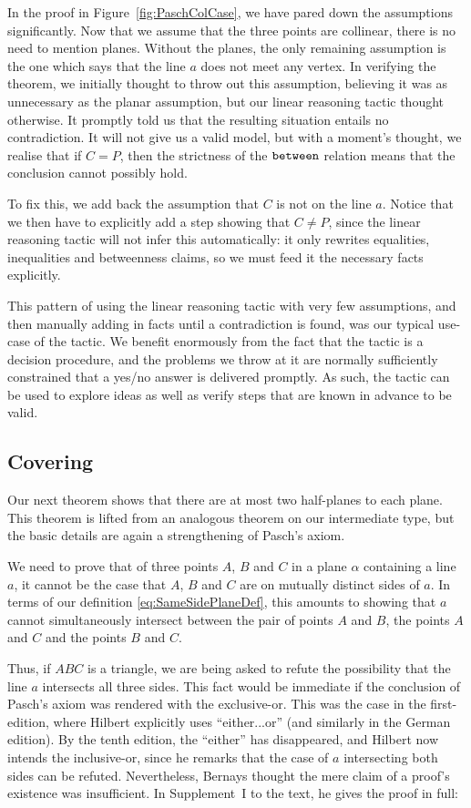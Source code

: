 In the proof in Figure~\ref{fig:PaschColCase}, we have pared down the assumptions significantly. Now that we assume that the three points are collinear, there is no need to mention planes. Without the planes, the only remaining assumption is the one which says that the line $a$ does not meet any vertex. In verifying the theorem, we initially thought to throw out this assumption, believing it was as unnecessary as the planar assumption, but our linear reasoning tactic thought otherwise. It promptly told us that the resulting situation entails no contradiction. It will not give us a valid model, but with a moment's thought, we realise that if $C = P$, then the strictness of the $\texttt{between}$ relation means that the conclusion cannot possibly hold.

To fix this, we add back the assumption that $C$ is not on the line $a$. Notice that we then have to explicitly add a step showing that $C \neq P$, since the linear reasoning tactic will not infer this automatically: it only rewrites equalities, inequalities and betweenness claims, so we must feed it the necessary facts explicitly.

This pattern of using the linear reasoning tactic with very few assumptions, and then manually adding in facts until a contradiction is found, was our typical use-case of the tactic. We benefit enormously from the fact that the tactic is a decision procedure, and the problems we throw at it are normally sufficiently constrained that a yes/no answer is delivered promptly. As such, the tactic can be used to explore ideas as well as verify steps that are known in advance to be valid.

\subsection{Covering}
Our next theorem shows that there are at most two half-planes to each plane. This theorem is lifted from an analogous theorem on our intermediate type, but the basic details are again a strengthening of Pasch's axiom.

We need to prove that of three points $A$, $B$ and $C$ in a plane $\alpha$ containing a line $a$, it cannot be the case that $A$, $B$ and $C$ are on mutually distinct sides of $a$. In terms of our definition \eqref{eq:SameSidePlaneDef}, this amounts to showing that $a$ cannot simultaneously intersect between the pair of points $A$ and $B$, the points $A$ and $C$ and the points $B$ and $C$. 

Thus, if $ABC$ is a triangle, we are being asked to refute the possibility that the line $a$ intersects all three sides. This fact would be immediate if the conclusion of Pasch's axiom was rendered with the exclusive-or. This was the case in the first-edition, where Hilbert explicitly uses ``either...or'' (and similarly in the German edition). By the tenth edition, the ``either'' has disappeared, and Hilbert now intends the inclusive-or, since he remarks that the case of $a$ intersecting both sides can be refuted. Nevertheless, Bernays thought the mere claim of a proof's existence was insufficient. In Supplement~I to the text, he gives the proof in full:

